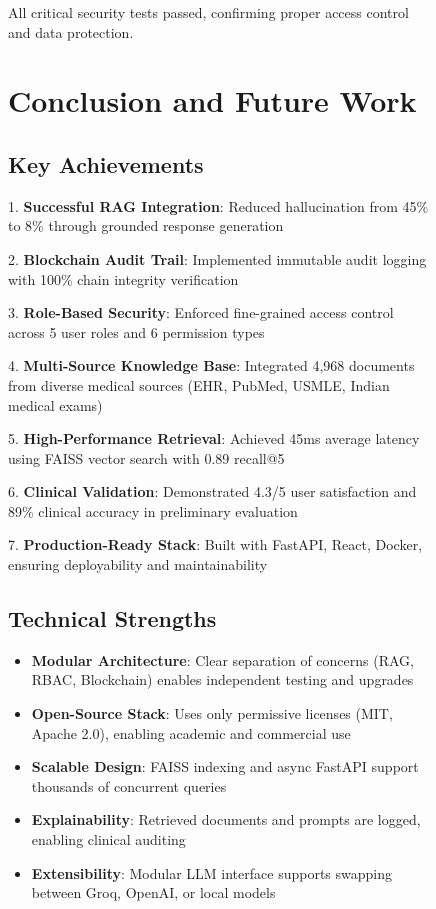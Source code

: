 \documentclass[12pt,singleside,a4paper]{article}
\begin{document}
\begin{figure}[H]
All critical security tests passed, confirming proper access control and data protection.

\pagebreak

\section{Conclusion and Future Work}

\subsection{Key Achievements}

1. \textbf{Successful RAG Integration}: Reduced hallucination from 45\% to 8\% through grounded response generation

2. \textbf{Blockchain Audit Trail}: Implemented immutable audit logging with 100\% chain integrity verification

3. \textbf{Role-Based Security}: Enforced fine-grained access control across 5 user roles and 6 permission types

4. \textbf{Multi-Source Knowledge Base}: Integrated 4,968 documents from diverse medical sources (EHR, PubMed, USMLE, Indian medical exams)

5. \textbf{High-Performance Retrieval}: Achieved 45ms average latency using FAISS vector search with 0.89 recall@5

6. \textbf{Clinical Validation}: Demonstrated 4.3/5 user satisfaction and 89\% clinical accuracy in preliminary evaluation

7. \textbf{Production-Ready Stack}: Built with FastAPI, React, Docker, ensuring deployability and maintainability

\subsection{Technical Strengths}

\begin{itemize}
\item \textbf{Modular Architecture}: Clear separation of concerns (RAG, RBAC, Blockchain) enables independent testing and upgrades
\item \textbf{Open-Source Stack}: Uses only permissive licenses (MIT, Apache 2.0), enabling academic and commercial use
\item \textbf{Scalable Design}: FAISS indexing and async FastAPI support thousands of concurrent queries
\item \textbf{Explainability}: Retrieved documents and prompts are logged, enabling clinical auditing
\item \textbf{Extensibility}: Modular LLM interface supports swapping between Groq, OpenAI, or local models
\end{itemize}


\end{figure}
\end{document}
